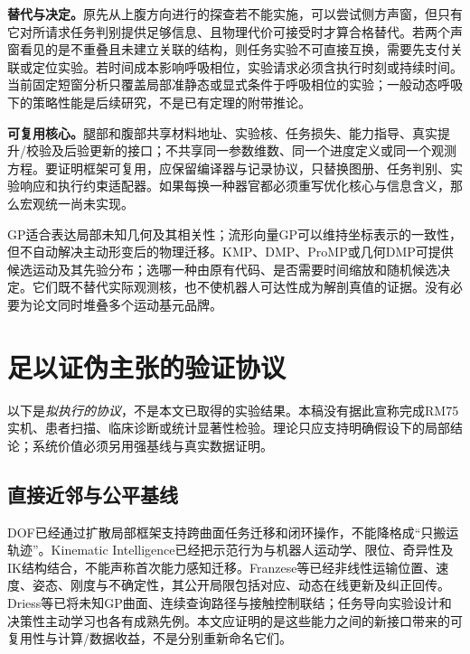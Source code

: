 \documentclass[11pt,a4paper]{article}
\numberwithin{equation}{section}
\theoremstyle{definition}
\begin{document}
\textbf{替代与决定。}原先从上腹方向进行的探查若不能实施，可以尝试侧方声窗，但只有它对所请求任务判别提供足够信息、且物理代价可接受时才算合格替代。若两个声窗看见的是不重叠且未建立关联的结构，则任务实验不可直接互换，需要先支付关联或定位实验。若时间成本影响呼吸相位，实验请求必须含执行时刻或持续时间。当前固定短窗分析只覆盖局部准静态或显式条件于呼吸相位的实验；一般动态呼吸下的策略性能是后续研究，不是已有定理的附带推论。

\textbf{可复用核心。}腿部和腹部共享材料地址、实验核、任务损失、能力指导、真实提升/校验及后验更新的接口；不共享同一参数维数、同一个进度定义或同一个观测方程。要证明框架可复用，应保留编译器与记录协议，只替换图册、任务判别、实验响应和执行约束适配器。如果每换一种器官都必须重写优化核心与信息含义，那么宏观统一尚未实现。

GP适合表达局部未知几何及其相关性；流形向量GP可以维持坐标表示的一致性，但不自动解决主动形变后的物理迁移\cite{hutchinson2021}。KMP、DMP、ProMP或几何DMP可提供候选运动及其先验分布；选哪一种由原有代码、是否需要时间缩放和随机候选决定。它们既不替代实际观测核，也不使机器人可达性成为解剖真值的证据。没有必要为论文同时堆叠多个运动基元品牌。

\section{足以证伪主张的验证协议}
\label{graph:sec:experiments}

以下是\emph{拟执行的协议}，不是本文已取得的实验结果。本稿没有据此宣称完成RM75实机、患者扫描、临床诊断或统计显著性检验。理论只应支持明确假设下的局部结论；系统价值必须另用强基线与真实数据证明。

\subsection{直接近邻与公平基线}

DOF已经通过扩散局部框架支持跨曲面任务迁移和闭环操作，不能降格成``只搬运轨迹''\cite{dof2026}。Kinematic Intelligence已经把示范行为与机器人运动学、限位、奇异性及IK结构结合，不能声称首次能力感知迁移\cite{ki2026}。Franzese等已经非线性运输位置、速度、姿态、刚度与不确定性，其公开局限包括对应、动态在线更新及纠正回传\cite{franzese2025}。Driess等已将未知GP曲面、连续查询路径与接触控制联结\cite{driess2017}；任务导向实验设计和决策性主动学习也各有成熟先例\cite{attia2018,javdani2014}。本文应证明的是这些能力之间的新接口带来的可复用性与计算/数据收益，不是分别重新命名它们。
\end{document}
